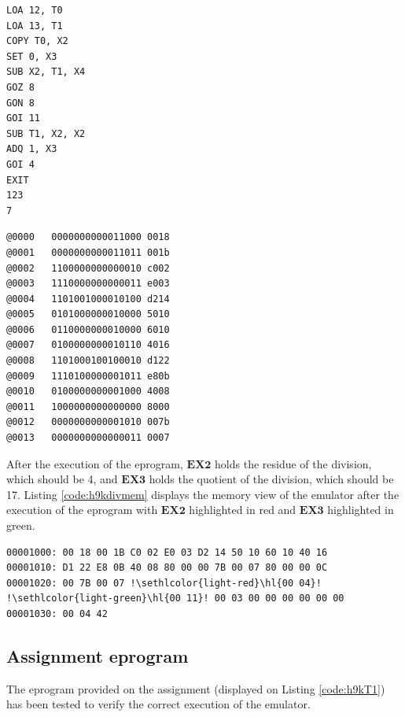 \documentclass[11pt, a4paper]{article}
\begin{document}
\noindent
\begin{minipage}{.40\textwidth}
	\begin{lstlisting}[style=customasm, caption={HAL9000 division code}, label={code:h9kdivimpl}]
LOA 12, T0
LOA 13, T1
COPY T0, X2
SET 0, X3
SUB X2, T1, X4
GOZ 8
GON 8
GOI 11
SUB T1, X2, X2
ADQ 1, X3
GOI 4
EXIT
123
7
	\end{lstlisting}
\end{minipage}
\hfill
\begin{minipage}{.55\textwidth}
	\begin{lstlisting}[style=customasm, caption={HAL9000 assembled division code},
		label={code:h9kdivimlpasm}]
@0000   0000000000011000 0018
@0001   0000000000011011 001b
@0002   1100000000000010 c002
@0003   1110000000000011 e003
@0004   1101001000010100 d214
@0005   0101000000010000 5010
@0006   0110000000010000 6010
@0007   0100000000010110 4016
@0008   1101000100100010 d122
@0009   1110100000001011 e80b
@0010   0100000000001000 4008
@0011   1000000000000000 8000
@0012   0000000000001010 007b
@0013   0000000000000011 0007
	\end{lstlisting}
\end{minipage}

After the execution of the eprogram, $\mathbf{EX2}$ holds the residue of the division, which should
be 4, and $\mathbf{EX3}$ holds the quotient of the division, which should be 17. Listing
\ref{code:h9kdivmem} displays the memory view of the emulator after the execution of the eprogram
with $\mathbf{EX2}$ highlighted in red and $\mathbf{EX3}$ highlighted in green.
\begin{lstlisting}[style=customasm, caption={HAL9000 division code memory view},
	label={code:h9kdivmem}, escapechar=!, columns=fullflexible]
00001000: 00 18 00 1B C0 02 E0 03 D2 14 50 10 60 10 40 16
00001010: D1 22 E8 0B 40 08 80 00 00 7B 00 07 80 00 00 0C
00001020: 00 7B 00 07 !\sethlcolor{light-red}\hl{00 04}! !\sethlcolor{light-green}\hl{00 11}! 00 03 00 00 00 00 00 00
00001030: 00 04 42
\end{lstlisting}

\subsection{Assignment eprogram}
The eprogram provided on the assignment (displayed on Listing \ref{code:h9kT1}) has been tested to verify the
correct execution of the emulator.
\end{document}
